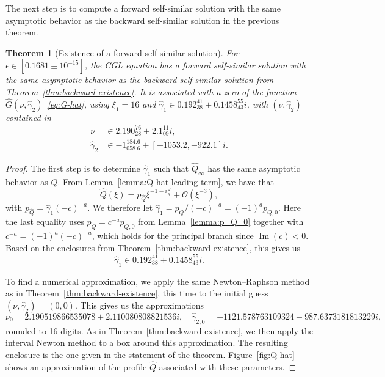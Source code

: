 \documentclass[11pt]{article}
\DeclareMathOperator{\imag}{Im}
\newtheorem{theorem}[definition]{Theorem}
\newcommand{\codenumber}[1]{#1}
\newcommand{\resultnumber}[1]{#1}
\begin{document}
The next step is to compute a forward self-similar solution with the
same asymptotic behavior as the backward self-similar solution in the
previous theorem.

\begin{theorem}[Existence of a forward self-similar solution]\label{thm:forward-existence}
  For \(\epsilon \in \codenumber{[0.1681 \pm 10^{-15}]}\), the CGL
  equation has a forward self-similar solution with the same
  asymptotic behavior as the backward self-similar solution from
  Theorem~\ref{thm:backward-existence}. It is associated with a zero
  of the function \(\hat{G}(\nu, \hat{\gamma}_{2})\)~\eqref{eq:G-hat},
  using \(\xi_{1} = \codenumber{16}\) and
  \(\hat{\gamma}_{1} \in \resultnumber{0.192_{38}^{41} +
    0.1458_{43}^{55} i}\), with \((\nu, \hat{\gamma}_{2})\) contained
  in
  \begin{align*}
    \nu &\in \resultnumber{2.190_{28}^{76} + 2.1_{09}^{11} i},\\
    \hat{\gamma}_{2} &\in \resultnumber{-1_{058.6}^{184.6} + [-1053.2, -922.1] i}.
  \end{align*}
\end{theorem}

\begin{proof}
  The first step is to determine \(\hat{\gamma}_{1}\) such that
  \(\hat{Q}_{\infty}\) has the same asymptotic behavior as \(Q\). From
  Lemma~\ref{lemma:Q-hat-leading-term}, we have that
  \begin{equation*}
    \hat{Q}(\xi) = p_{\hat{Q}}\xi^{-1 - i\frac{\omega}{\kappa}} + \mathcal{O}(\xi^{-3}),
  \end{equation*}
  with \(p_{\hat{Q}} = \hat{\gamma}_{1}(-c)^{-a}\). We therefore let
  \(\hat{\gamma}_{1} = p_{Q} / (-c)^{-a} = (-1)^{a}p_{Q,0}\). Here the
  last equality uses \(p_{Q} = c^{-a}p_{Q,0}\) from
  Lemma~\ref{lemma:p_Q_0} together with
  \(c^{-a} = (-1)^{a}(-c)^{-a}\), which holds for the principal branch
  since \(\imag(c) < 0\). Based on the enclosures from
  Theorem~\ref{thm:backward-existence}, this gives us
  \begin{equation*}
    \hat{\gamma}_{1} \in \resultnumber{0.192_{38}^{41} + 0.1458_{43}^{55} i}.
  \end{equation*}

  To find a numerical approximation, we apply the same Newton--Raphson
  method as in Theorem~\ref{thm:backward-existence}, this time to the
  initial guess \((\nu, \hat{\gamma}_{2}) = (0, 0)\). This gives us the
  approximations
  \begin{equation*}
    \nu_{0} = \resultnumber{2.190519866535078 + 2.110080808821536i},\quad
    \hat{\gamma}_{2,0} = \resultnumber{-1121.578763109324 - 987.6373181813229i},
  \end{equation*}
  rounded to 16 digits. As in Theorem~\ref{thm:backward-existence}, we
  then apply the interval Newton method to a box around this
  approximation. The resulting enclosure is the one given in the
  statement of the theorem. Figure~\ref{fig:Q-hat} shows an
  approximation of the profile \(\hat{Q}\) associated with these
  parameters.
\end{proof}
\end{document}
